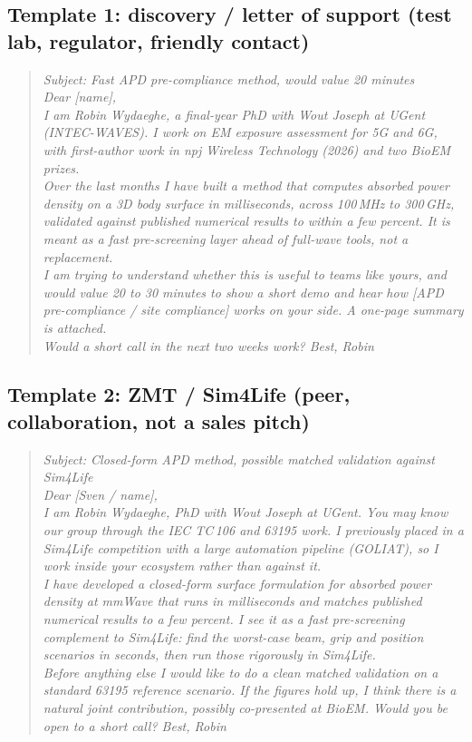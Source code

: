 \documentclass[11pt,a4paper]{article}
\begin{document}
\subsection*{Template 1: discovery / letter of support (test lab, regulator, friendly contact)}
\begin{quote}\itshape
Subject: Fast APD pre-compliance method, would value 20 minutes\\[0.3em]
Dear [name],\\[0.3em]
I am Robin Wydaeghe, a final-year PhD with Wout Joseph at UGent (INTEC-WAVES). I work on EM exposure assessment for 5G and 6G, with first-author work in npj Wireless Technology (2026) and two BioEM prizes.\\[0.3em]
Over the last months I have built a method that computes absorbed power density on a 3D body surface in milliseconds, across 100\,MHz to 300\,GHz, validated against published numerical results to within a few percent. It is meant as a fast pre-screening layer ahead of full-wave tools, not a replacement.\\[0.3em]
I am trying to understand whether this is useful to teams like yours, and would value 20 to 30 minutes to show a short demo and hear how [APD pre-compliance / site compliance] works on your side. A one-page summary is attached.\\[0.3em]
Would a short call in the next two weeks work? Best, Robin
\end{quote}

\subsection*{Template 2: ZMT / Sim4Life (peer, collaboration, not a sales pitch)}
\begin{quote}\itshape
Subject: Closed-form APD method, possible matched validation against Sim4Life\\[0.3em]
Dear [Sven / name],\\[0.3em]
I am Robin Wydaeghe, PhD with Wout Joseph at UGent. You may know our group through the IEC TC\,106 and 63195 work. I previously placed in a Sim4Life competition with a large automation pipeline (GOLIAT), so I work inside your ecosystem rather than against it.\\[0.3em]
I have developed a closed-form surface formulation for absorbed power density at mmWave that runs in milliseconds and matches published numerical results to a few percent. I see it as a fast pre-screening complement to Sim4Life: find the worst-case beam, grip and position scenarios in seconds, then run those rigorously in Sim4Life.\\[0.3em]
Before anything else I would like to do a clean matched validation on a standard 63195 reference scenario. If the figures hold up, I think there is a natural joint contribution, possibly co-presented at BioEM. Would you be open to a short call? Best, Robin
\end{quote}
\end{document}
